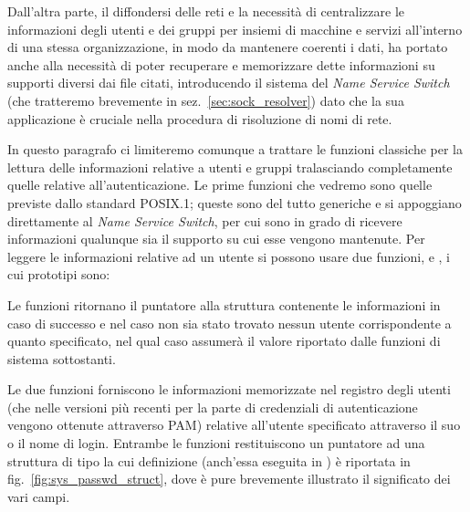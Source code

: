 Dall'altra parte, il diffondersi delle reti e la necessità di centralizzare le
informazioni degli utenti e dei gruppi per insiemi di macchine e servizi
all'interno di una stessa organizzazione, in modo da mantenere coerenti i
dati, ha portato anche alla necessità di poter recuperare e memorizzare dette
informazioni su supporti diversi dai file citati, introducendo il sistema del
\textit{Name Service Switch} (che tratteremo brevemente in
sez.~\ref{sec:sock_resolver}) dato che la sua applicazione è cruciale nella
procedura di risoluzione di nomi di rete.

In questo paragrafo ci limiteremo comunque a trattare le funzioni classiche
per la lettura delle informazioni relative a utenti e gruppi tralasciando
completamente quelle relative all'autenticazione. 
Le prime funzioni che vedremo sono quelle previste dallo standard POSIX.1;
queste sono del tutto generiche e si appoggiano direttamente al \textit{Name
  Service Switch}, per cui sono in grado di ricevere informazioni qualunque
sia il supporto su cui esse vengono mantenute.  Per leggere le informazioni
relative ad un utente si possono usare due funzioni,  e
, i cui prototipi sono:

\begin{funcproto}{
}

{Le funzioni ritornano il puntatore alla struttura contenente le informazioni
  in caso di successo e  nel caso non sia stato trovato nessun
  utente corrispondente a quanto specificato, nel qual caso 
  assumerà il valore riportato dalle funzioni di sistema sottostanti.}
\end{funcproto}

Le due funzioni forniscono le informazioni memorizzate nel registro degli
utenti (che nelle versioni più recenti per la parte di credenziali di
autenticazione vengono ottenute attraverso PAM) relative all'utente
specificato attraverso il suo  o il nome di login. Entrambe le
funzioni restituiscono un puntatore ad una struttura di tipo 
la cui definizione (anch'essa eseguita in ) è riportata in
fig.~\ref{fig:sys_passwd_struct}, dove è pure brevemente illustrato il
significato dei vari campi.

